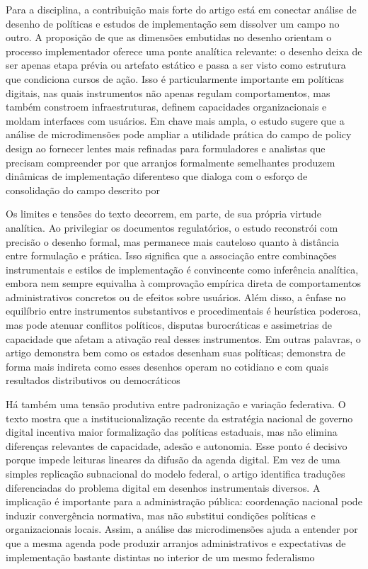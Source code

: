 \documentclass[12pt,a4paper]{article}
\begin{document}
Para a disciplina, a contribuição mais forte do artigo está em conectar análise de desenho de políticas e estudos de implementação sem dissolver um campo no outro. A proposição de que as dimensões embutidas no desenho orientam o processo implementador oferece uma ponte analítica relevante: o desenho deixa de ser apenas etapa prévia ou artefato estático e passa a ser visto como estrutura que condiciona cursos de ação. Isso é particularmente importante em políticas digitais, nas quais instrumentos não apenas regulam comportamentos, mas também constroem infraestruturas, definem capacidades organizacionais e moldam interfaces com usuários. Em chave mais ampla, o estudo sugere que a análise de microdimensões pode ampliar a utilidade prática do campo de policy design ao fornecer lentes mais refinadas para formuladores e analistas que precisam compreender por que arranjos formalmente semelhantes produzem dinâmicas de implementação diferentes\parencite{lui2026_micro_dimensions}o que dialoga com o esforço de consolidação do campo descrito por\parencite{lima2021_conectando_problemas}

Os limites e tensões do texto decorrem, em parte, de sua própria virtude analítica. Ao privilegiar os documentos regulatórios, o estudo reconstrói com precisão o desenho formal, mas permanece mais cauteloso quanto à distância entre formulação e prática. Isso significa que a associação entre combinações instrumentais e estilos de implementação é convincente como inferência analítica, embora nem sempre equivalha à comprovação empírica direta de comportamentos administrativos concretos ou de efeitos sobre usuários. Além disso, a ênfase no equilíbrio entre instrumentos substantivos e procedimentais é heurística poderosa, mas pode atenuar conflitos políticos, disputas burocráticas e assimetrias de capacidade que afetam a ativação real desses instrumentos. Em outras palavras, o artigo demonstra bem como os estados desenham suas políticas; demonstra de forma mais indireta como esses desenhos operam no cotidiano e com quais resultados distributivos ou democráticos\parencite{lui2026_micro_dimensions}

Há também uma tensão produtiva entre padronização e variação federativa. O texto mostra que a institucionalização recente da estratégia nacional de governo digital incentiva maior formalização das políticas estaduais, mas não elimina diferenças relevantes de capacidade, adesão e autonomia. Esse ponto é decisivo porque impede leituras lineares da difusão da agenda digital. Em vez de uma simples replicação subnacional do modelo federal, o artigo identifica traduções diferenciadas do problema digital em desenhos instrumentais diversos. A implicação é importante para a administração pública: coordenação nacional pode induzir convergência normativa, mas não substitui condições políticas e organizacionais locais. Assim, a análise das microdimensões ajuda a entender por que a mesma agenda pode produzir arranjos administrativos e expectativas de implementação bastante distintas no interior de um mesmo federalismo\parencite{lui2026_micro_dimensions}
\end{document}
